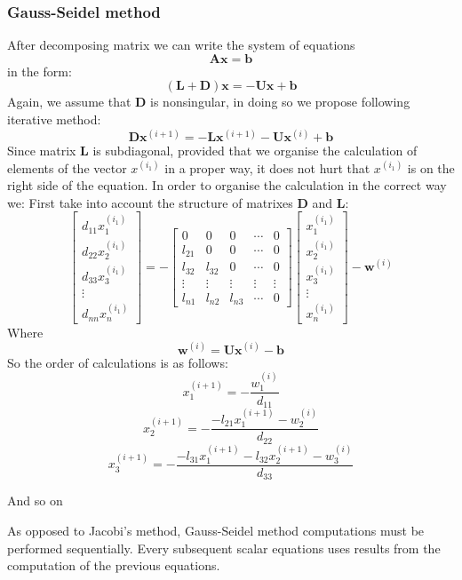 \documentclass[12pt]{report}
\begin{document}
\subsubsection{Gauss-Seidel method}
After decomposing matrix we can write the system of equations
\[ \mathbf{A}\mathbf{x} = \mathbf{b} \]
in the form:
\[ (\mathbf{L}+\mathbf{D})\mathbf{x} = -\mathbf{U}\mathbf{x}+\mathbf{b}
\]
Again, we assume that \textbf{D} is nonsingular, in doing so we propose following iterative method:
\[ \mathbf{D}\mathbf{x}^{(i+1)} = -\mathbf{L}\mathbf{x}^{(i+1)}-\mathbf{U}\mathbf{x}^{(i)}+\mathbf{b}
\]
Since matrix \textbf{L} is subdiagonal, provided that we organise the calculation of elements of the vector $x^{(i_1)}$ in a proper way, it does not hurt that $x^{(i_1)}$ is on the right side of the equation.
\newpage
In order to organise the calculation in the correct way we:
First take into account the structure of matrixes \textbf{D} and \textbf{L}:
\[
\begin{bmatrix}
d_{11}x_1^{(i_1)}\\
d_{22}x_2^{(i_1)}\\
d_{33}x_3^{(i_1)}\\
\vdots\\
d_{nn}x_n^{(i_1)}
\end{bmatrix}
=
-
\begin{bmatrix}
0 & 0 & 0 & \cdots & 0\\
l_{21} & 0 & 0 & \cdots & 0\\
l_{32} & l_{32} & 0 & \cdots & 0\\
\vdots & \vdots & \vdots & \vdots & \vdots\\
l_{n1} & l_{n2} & l_{n3} & \cdots & 0
\end{bmatrix}
\begin{bmatrix}
x_1^{(i_1)}\\
x_2^{(i_1)}\\
x_3^{(i_1)}\\
\vdots\\
x_n^{(i_1)}
\end{bmatrix}
-
\mathbf{w}^{(i)}
\]
Where
\[ \mathbf{w}^{(i)} = \mathbf{U}\mathbf{x}^{(i)} - \mathbf{b} \]
So the order of calculations is as follows:
\[ x_1^{(i+1)} = -\frac{w_1^{(i)}}{d_{11}} \]
\[ x_2^{(i+1)} = -\frac{-l_{21}x_1^{(i+1)} - w_2^{(i)}}{d_{22}} \]
\[ x_3^{(i+1)} = -\frac{-l_{31}x_1^{(i+1)} -l_{32}x_2^{(i+1)} - w_3^{(i)}}{d_{33}} \]

And so on

As opposed to Jacobi's method, Gauss-Seidel method computations must be performed sequentially. Every subsequent scalar equations uses results from the computation of the previous equations.
\end{document}
